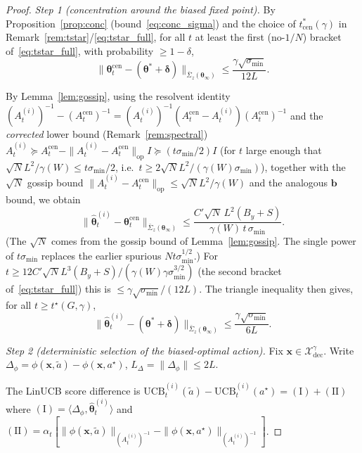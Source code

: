 \documentclass[11pt]{article}
\begin{document}
\begin{proof}
\textit{Step 1 (concentration around the biased fixed point).}
By Proposition~\ref{prop:conc} (bound~\eqref{eq:conc_sigma}) and the
choice of $t_{\mathrm{cen}}^*(\gamma)$ in
Remark~\ref{rem:tstar}/\eqref{eq:tstar_full}, for all $t$ at least the
first (no-$1/N$) bracket of~\eqref{eq:tstar_full}, with probability
$\geq 1-\delta$,
\[
\|\bm{\theta}_t^{\mathrm{cen}}-(\bm{\theta}^{\!*}+\bm{\delta})\|_{\bar{\Sigma}_z(\bm{\theta}_\infty)}
\leq\frac{\gamma\sqrt{\sigma_{\min}}}{12L}.
\]

By Lemma~\ref{lem:gossip}, using the resolvent identity
$(A_t^{(i)})^{-1}-(A_t^{\mathrm{cen}})^{-1}
=(A_t^{(i)})^{-1}(A_t^{\mathrm{cen}}-A_t^{(i)})(A_t^{\mathrm{cen}})^{-1}$
and the \emph{corrected} lower bound (Remark~\ref{rem:spectral})
$A_t^{(i)}\succeq A_t^{\mathrm{cen}}-\|A_t^{(i)}-A_t^{\mathrm{cen}}\|_{\mathrm{op}} I
\succeq(t\sigma_{\min}/2)I$
(for $t$ large enough that
$\sqrt{N}L^2/\gamma(W)\leq t\sigma_{\min}/2$, i.e.\
$t\geq 2\sqrt N L^2/(\gamma(W)\sigma_{\min})$), together with the
$\sqrt N$ gossip bound $\|A_t^{(i)}-A_t^{\mathrm{cen}}\|_{\mathrm{op}}\leq
\sqrt N L^2/\gamma(W)$ and the analogous $\bm{b}$ bound, we obtain
\[
\|\widehat{\bm{\theta}}_t^{(i)}-\bm{\theta}_t^{\mathrm{cen}}\|_{\bar{\Sigma}_z(\bm{\theta}_\infty)}
\leq\frac{C'\sqrt{N}\,L^2(B_y+S)}{\gamma(W)\,t\,\sigma_{\min}}.
\]
(The $\sqrt N$ comes from the gossip bound of Lemma~\ref{lem:gossip}.
The single power of $t\sigma_{\min}$ replaces the earlier spurious
$Nt\sigma_{\min}^{1/2}$.)  For
$t\geq 12C'\sqrt N L^3(B_y+S)/(\gamma(W)\gamma\sigma_{\min}^{3/2})$
(the second bracket of~\eqref{eq:tstar_full}) this is
$\leq\gamma\sqrt{\sigma_{\min}}/(12L)$.
The triangle inequality then gives, for all $t\geq t^\star(G,\gamma)$,
\begin{equation}
\|\widehat{\bm{\theta}}_t^{(i)}-(\bm{\theta}^{\!*}+\bm{\delta})\|_{\bar{\Sigma}_z(\bm{\theta}_\infty)}
\leq\frac{\gamma\sqrt{\sigma_{\min}}}{6L}.
\label{eq:theta_hat_close}
\end{equation}

\textit{Step 2 (deterministic selection of the biased-optimal action).}
Fix $\bm{x}\in\mathcal{X}_{\mathrm{dec}}^\gamma$.
Write $\Delta_\phi=\phi(\bm{x},\tilde{a})-\phi(\bm{x},a^\star)$,
$L_\Delta=\|\Delta_\phi\|\leq 2L$.

The LinUCB score difference is
$\mathrm{UCB}_t^{(i)}(\tilde{a})-\mathrm{UCB}_t^{(i)}(a^\star)
=(\mathrm{I})+(\mathrm{II})$
where $(\mathrm{I})=\langle\Delta_\phi,\widehat{\bm{\theta}}_t^{(i)}\rangle$
and $(\mathrm{II})=\alpha_t[\|\phi(\bm{x},\tilde{a})\|_{(A_t^{(i)})^{-1}}
-\|\phi(\bm{x},a^\star)\|_{(A_t^{(i)})^{-1}}]$.


\end{proof}
\end{document}
